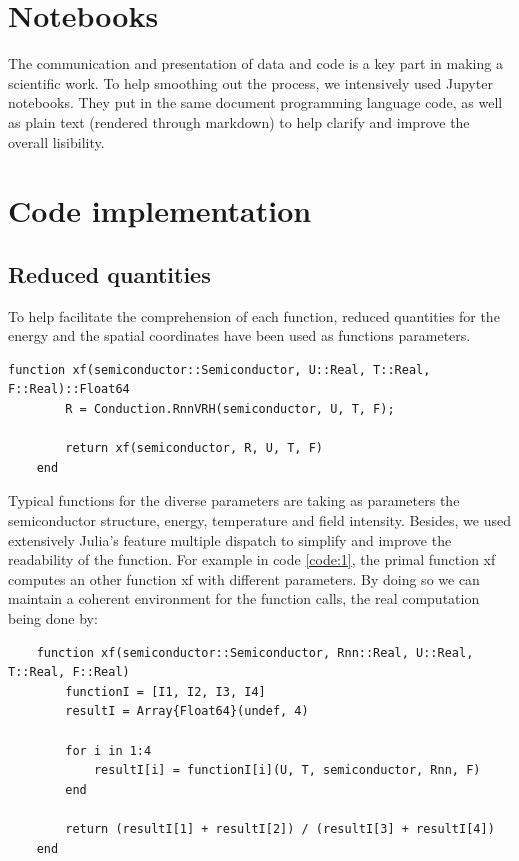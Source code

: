 \section{Notebooks}

The communication and presentation of data and code is a key part in making a scientific work. To help smoothing out the process, we intensively used Jupyter notebooks. They put in the same document programming language code, as well as plain text (rendered through markdown) to help clarify and improve the overall lisibility.

\section{Code implementation}

\subsection{Reduced quantities}

To help facilitate the comprehension of each function, reduced quantities for the energy and the spatial coordinates have been used as functions parameters.

\begin{lstlisting}[label={code:1}]
    function xf(semiconductor::Semiconductor, U::Real, T::Real, F::Real)::Float64
        R = Conduction.RnnVRH(semiconductor, U, T, F);

        return xf(semiconductor, R, U, T, F)
    end
\end{lstlisting}

Typical functions for the diverse parameters are taking as parameters the semiconductor structure, energy, temperature and field intensity. Besides, we used extensively Julia's feature multiple dispatch to simplify and improve the readability of the function. For example in code \ref{code:1}, the primal function xf computes an other function xf with different parameters. By doing so we can maintain a coherent environment for the function calls, the real computation being done by:

\begin{lstlisting}
    function xf(semiconductor::Semiconductor, Rnn::Real, U::Real, T::Real, F::Real)
        functionI = [I1, I2, I3, I4]
        resultI = Array{Float64}(undef, 4)

        for i in 1:4
            resultI[i] = functionI[i](U, T, semiconductor, Rnn, F)
        end

        return (resultI[1] + resultI[2]) / (resultI[3] + resultI[4])
    end
\end{lstlisting}

